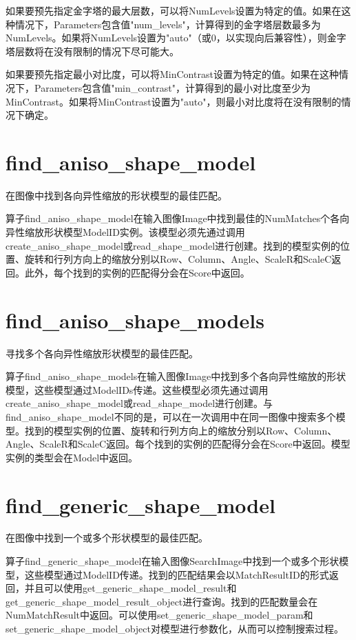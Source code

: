 \documentclass{article}
\begin{document}
如果要预先指定金字塔的最大层数，可以将NumLevels设置为特定的值。如果在这种情况下，Parameters包含值"num\_levels"，计算得到的金字塔层数最多为NumLevels。如果将NumLevels设置为"auto"（或0，以实现向后兼容性），则金字塔层数将在没有限制的情况下尽可能大。

如果要预先指定最小对比度，可以将MinContrast设置为特定的值。如果在这种情况下，Parameters包含值"min\_contrast"，计算得到的最小对比度至少为MinContrast。如果将MinContrast设置为"auto"，则最小对比度将在没有限制的情况下确定。

\section{find\_aniso\_shape\_model}
在图像中找到各向异性缩放的形状模型的最佳匹配。

算子find\_aniso\_shape\_model在输入图像Image中找到最佳的NumMatches个各向异性缩放形状模型ModelID实例。该模型必须先通过调用create\_aniso\_shape\_model或read\_shape\_model进行创建。找到的模型实例的位置、旋转和行列方向上的缩放分别以Row、Column、Angle、ScaleR和ScaleC返回。此外，每个找到的实例的匹配得分会在Score中返回。

\section{find\_aniso\_shape\_models}
寻找多个各向异性缩放形状模型的最佳匹配。

算子find\_aniso\_shape\_models在输入图像Image中找到多个各向异性缩放的形状模型，这些模型通过ModelIDs传递。这些模型必须先通过调用create\_aniso\_shape\_model或read\_shape\_model进行创建。与find\_aniso\_shape\_model不同的是，可以在一次调用中在同一图像中搜索多个模型。找到的模型实例的位置、旋转和行列方向上的缩放分别以Row、Column、Angle、ScaleR和ScaleC返回。每个找到的实例的匹配得分会在Score中返回。模型实例的类型会在Model中返回。

\section{find\_generic\_shape\_model}
在图像中找到一个或多个形状模型的最佳匹配。

算子find\_generic\_shape\_model在输入图像SearchImage中找到一个或多个形状模型，这些模型通过ModelID传递。找到的匹配结果会以MatchResultID的形式返回，并且可以使用get\_generic\_shape\_model\_result和get\_generic\_shape\_model\_result\_object进行查询。找到的匹配数量会在NumMatchResult中返回。可以使用set\_generic\_shape\_model\_param和set\_generic\_shape\_model\_object对模型进行参数化，从而可以控制搜索过程。
\end{document}
